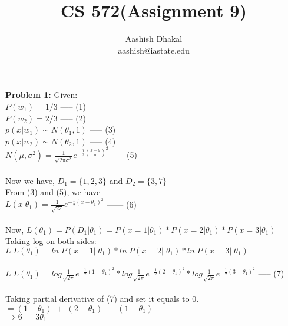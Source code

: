 \documentclass[11pt]{article}
\begin{document}
\title{CS 572(Assignment 9)} %
\author{Aashish Dhakal\\ %
aashish@iastate.edu\\%
 }      %
\date{}


\maketitle
\section*{}

\textbf{Problem 1:}
Given: \\
$P(w_1) = 1/3$ ----- (1)\\
$P(w_2) = 2/3$ ----- (2)\\
$p(x|w_1) \sim N(\theta_1,1)$ ----- (3)\\
$p(x|w_2) \sim N(\theta_2,1)$ ----- (4)\\
$N(\mu, \sigma^2) = \frac{1}{\sqrt{2\pi\sigma^2}}e^{{-\frac{1}{2}}(\frac{x-\mu}{\sigma})^2}$ ----- (5)\\ \\
Now we have, $D_1= \{ 1, 2, 3\}$ and $D_2 = \{ 3, 7\}$ \\
From (3) and (5), we have\\
$L(x|\theta_1) = \frac{1}{\sqrt{2\pi}}e^{{-\frac{1}{2}}(x-\theta_1)^2}$ ------ (6)\\ \\
Now,
$L(\theta_1) = P(D_1|\theta_1) = P (x = 1 | \theta_1) * P (x = 2 | \theta_1) * P (x = 3 | \theta_1)$\\
Taking log on both sides:\\
$L \; L(\theta_1) = ln\; P (x = 1 |\; \theta_1) * ln\; P (x = 2 |\; \theta_1) * ln\; P (x = 3 |\; \theta_1)$\\ \\
$L \; L(\theta_1) = log \frac{1}{\sqrt{2\pi}}e^{{-\frac{1}{2}}(1-\theta_1)^2} * log \frac{1}{\sqrt{2\pi}}e^{{-\frac{1}{2}}(2-\theta_1)^2} *
log \frac{1}{\sqrt{2\pi}}e^{{-\frac{1}{2}}(3-\theta_1)^2}$ ----- (7)\\ \\
Taking partial derivative of (7) and set it equals to 0.\\
$= (1-\theta_1)\; +\; (2-\theta_1)\; +\; (1-\theta_1)\;$ \\
$\Rightarrow 6 \; = 3\theta_1$\\
\end{document}
